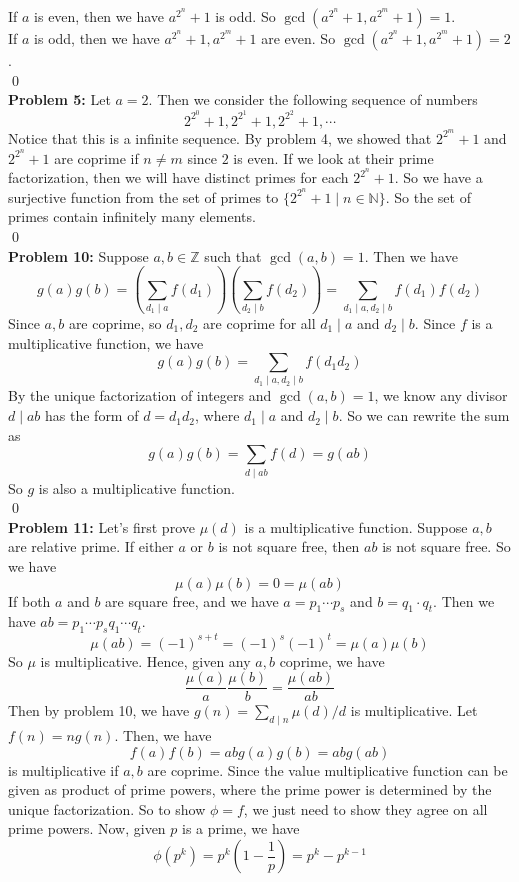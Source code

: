 \documentclass[12pt]{amsart}
\newcommand{\Z}{\mathbb{Z}}
\newcommand{\N}{\mathbb{N}}
\begin{document}
If $a$ is even, then we have $a^{2^n}+1$ is odd. So $\gcd(a^{2^n}+1,a^{2^m}+1)=1$.\\
If $a$ is odd, then we have $a^{2^n}+1,a^{2^m}+1$ are even. So $\gcd(a^{2^n}+1,a^{2^m}+1)=2$.\\\qed\\
\textbf{Problem 5:} Let $a=2$. Then we consider the following sequence of numbers
\[2^{2^0}+1,2^{2^1}+1,2^{2^2}+1,\cdots\]
Notice that this is a infinite sequence. By problem 4, we showed that $2^{2^m}+1$ and $2^{2^n}+1$ are coprime if $n\neq m$ since $2$ is even. If we look at their prime factorization, then we will have distinct primes for each $2^{2^n}+1$. So we have a surjective function from the set of primes to $\{2^{2^n}+1\mid n\in \N\}$. So the set of primes contain infinitely many elements.
\\\qed\\
\textbf{Problem 10:} Suppose $a,b\in\Z$ such that $\gcd(a,b)=1$. Then we have 
\[g(a)g(b)=(\sum_{d_1\mid a}f(d_1))(\sum_{d_2\mid b}f(d_2))=\sum_{d_1\mid a,d_2\mid b}f(d_1)f(d_2)\]
Since $a,b$ are coprime, so $d_1,d_2$ are coprime for all $d_1\mid a$ and $d_2\mid b$. Since $f$ is a multiplicative function, we have 
\[g(a)g(b)=\sum_{d_1\mid a,d_2\mid b}f(d_1d_2)\]
By the unique factorization of integers and $\gcd(a,b)=1$, we know any divisor $d\mid ab$ has the form of $d=d_1d_2$, where $d_1\mid a$ and $d_2\mid b$. So we can rewrite the sum as 
\[g(a)g(b)=\sum_{d\mid ab}f(d)=g(ab)\]
So $g$ is also a multiplicative function.
\\\qed\\
\textbf{Problem 11:} Let's first prove $\mu(d)$ is a multiplicative function. Suppose $a,b$ are relative prime. If either $a$ or $b$ is not square free, then $ab$ is not square free. So we have \[\mu(a)\mu(b)=0=\mu(ab)\]
If both $a$ and $b$ are square free, and we have $a=p_1\cdots p_s$ and $b=q_1\cdot q_t$. Then we have $ab=p_1\cdots p_sq_1\cdots q_t$. 
\[\mu(ab)=(-1)^{s+t}=(-1)^s(-1)^t=\mu(a)\mu(b)\]
So $\mu$ is multiplicative. Hence, given any $a,b$ coprime, we have 
\[\frac{\mu(a)}{a}\frac{\mu(b)}{b}=\frac{\mu(ab)}{ab}\]
Then by problem 10, we have $g(n)=\sum_{d\mid n}\mu(d)/d$ is multiplicative. Let $f(n)=ng(n)$. Then, we have 
\[f(a)f(b)=abg(a)g(b)=abg(ab)\]
is multiplicative if $a,b$ are coprime. Since the value multiplicative function can be given as product of prime powers, where the prime power is determined by the unique factorization. So to show $\phi=f$, we just need to show they agree on all prime powers. Now, given $p$ is a prime, we have 
\[\phi(p^k)=p^{k}(1-\frac{1}{p} )=p^{k}-p^{k-1}\]
\end{document}
